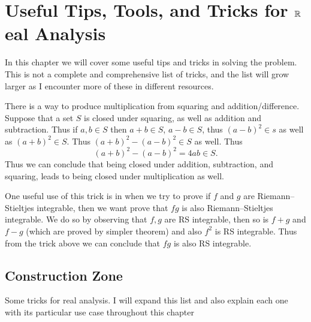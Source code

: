 \chapter{Useful Tips, Tools, and Tricks for $\mathbb{R}$eal Analysis}


In this chapter we will cover some useful tips and tricks in solving the problem. This is not a complete and comprehensive list of tricks, and the list will grow larger as I encounter more of these in different resources.

\begin{trick}
	There is a way to produce multiplication from squaring and addition/difference. Suppose that a set $S$ is closed under squaring, as well as addition and subtraction. Thus if $a,b \in S$ then $a+b \in S$, $a-b\in S$, thus $(a-b)^2 \in s$ as well as $(a+b)^2\in S$. Thus $(a+b)^2 - (a-b)^2 \in S$ as well. Thus
	\[  (a+b)^2 - (a-b)^2 = 4ab \in S. \]
	Thus we can conclude that being closed under addition, subtraction, and squaring, leads to being closed under multiplication as well.
\end{trick}
One useful use of this trick is in when we try to prove if $f$ and $g$ are Riemann–Stieltjes integrable, then we want prove that $fg$ is also Riemann–Stieltjes integrable. We do so by observing that $f,g$ are RS integrable, then so is $f+g$ and $f-g$ (which are proved by simpler theorem) and also $f^2$ is RS integrable. Thus from the trick above we can conclude that $fg$ is also RS integrable. 













\section{Construction Zone}
Some tricks for real analysis. I will expand this list and also explain each one with its particular use case throughout this chapter


